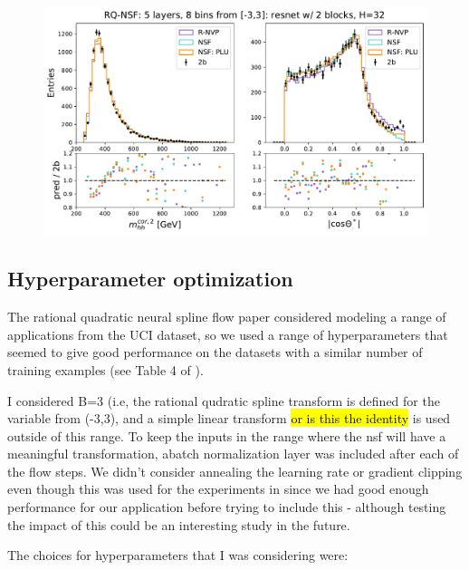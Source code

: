 \begin{figure}
\centering
\includegraphics[width=\textwidth]{figures/flows/data16_PFlow-FEB20-5jets_SM_2b_p_0.01_2b_detaCut/nsf_rq-coupling_log_pT_h1_log_pT_h2_eta_h1_eta_h2_log_dphi_hh_random_5_layers_H_32_2_blocks_K_8_B_3_lr_0.001_0.001_iter0/m_hh_cor2_absCosThetaStar_cf_rnvp_lu.pdf}
\caption{}
\label{subsec:hp-modelChoice}
\end{figure}

\subsection{Hyperparameter optimization}
\label{subsec:hpOpt}


The rational quadratic neural spline flow paper considered modeling a range of applications from  the UCI dataset, so we used a range of hyperparameters that seemed to give good performance on the datasets with a similar number of training examples (see Table 4 of \cite{1906.04032}).

I considered B=3 (i.e, the rational qudratic spline transform is defined for the variable from (-3,3), and a simple linear transform \hl{or is this the identity} is used outside of this range.  To keep the inputs in the range where the nsf will have a meaningful transformation, abatch normalization layer was included after each of the flow steps. We didn't consider annealing the learning rate or gradient clipping even though this was used for the experiments in \cite{1906.04032} since we had good enough performance for our application before trying to include this - although testing the impact of this could be an interesting study in the future.

The choices for hyperparameters that I was considering were:

